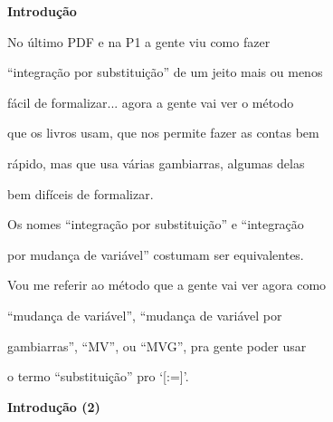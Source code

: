\documentclass[oneside,12pt]{article}
\begin{document}




{\bf Introdução}

No último PDF e na P1 a gente viu como fazer

``integração por substituição'' de um jeito mais ou menos

fácil de formalizar... agora a gente vai ver o método

que os livros usam, que nos permite fazer as contas bem

rápido, mas que usa várias gambiarras, algumas delas

bem difíceis de formalizar.

\msk

Os nomes ``integração por substituição'' e ``integração

por mudança de variável'' costumam ser equivalentes.

Vou me referir ao método que a gente vai ver agora como

``mudança de variável'', ``mudança de variável por

gambiarras'', ``MV'', ou ``MVG'', pra gente poder usar

o termo ``substituição'' pro `[:=]'.

\newpage


{\bf Introdução (2)}
\end{document}
